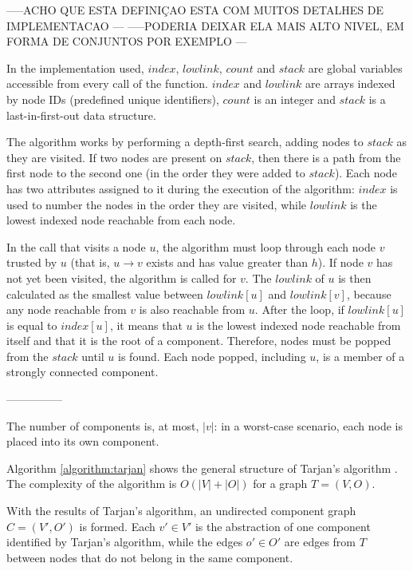 \documentclass[conference]{IEEEtran}
\begin{document}
-----ACHO QUE ESTA DEFINIÇAO ESTA COM MUITOS DETALHES DE IMPLEMENTACAO ---
-----PODERIA DEIXAR ELA MAIS ALTO NIVEL, EM FORMA DE CONJUNTOS POR EXEMPLO ---

In the implementation used, $index$, $lowlink$, $count$ and $stack$ are global variables accessible from every call of the function.
$index$ and $lowlink$ are arrays indexed by node IDs (predefined unique identifiers), $count$ is an integer and $stack$ is a last-in-first-out data structure.

The algorithm works by performing a depth-first search, adding nodes to $stack$ as they are visited.
If two nodes are present on $stack$, then there is a path from the first node to the second one (in the order they were added to $stack$).
Each node has two attributes assigned to it during the execution of the algorithm: $index$ is used to number the nodes in the order they are visited, while $lowlink$ is the lowest indexed node reachable from each node.

In the call that visits a node $u$, the algorithm must loop through each node $v$ trusted by $u$ (that is, $u \rightarrow v$ exists and has value greater than $h$).
If node $v$ has not yet been visited, the algorithm is called for  $v$.
The $lowlink$ of $u$ is then calculated as the smallest value between $lowlink[u]$ and $lowlink[v]$, because any node reachable from $v$ is also reachable from $u$.
After the loop, if $lowlink[u]$ is equal to $index[u]$, it means that $u$ is the lowest indexed node reachable from itself and that it is the root of a component.
Therefore, nodes must be popped from the $stack$ until $u$ is found.
Each node popped, including $u$, is a member of a strongly connected component.

---------------

The number of components is, at most, $|v|$: in a worst-case scenario, each node is placed into its own component.

Algorithm \autoref{algorithm:tarjan} shows the general structure of Tarjan's algorithm  \cite{tarjan1972depth}.
The complexity of the algorithm is $O(|V|+|O|)$ for a graph $T = (V,O)$.

With the results of Tarjan's algorithm, an undirected component graph $C = (V',O')$ is formed.
Each $v' \in V'$ is the abstraction of one component identified by Tarjan's algorithm, while the edges $o' \in O'$ are edges from $T$ between nodes that do not belong in the same component.
\end{document}
